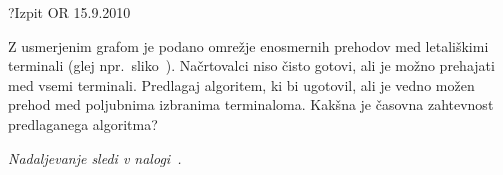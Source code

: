 \begin{naloga}{?}{Izpit OR 15.9.2010}
\begin{vprasanje}
Z usmerjenim grafom je podano omrežje enosmernih prehodov
med letališkimi terminali (glej npr.~sliko~).
Načrtovalci niso čisto gotovi, ali je možno prehajati med vsemi terminali.
Predlagaj algoritem, ki bi ugotovil,
ali je vedno možen prehod med poljubnima izbranima terminaloma.
Kakšna je časovna zahtevnost predlaganega algoritma?

{\em Nadaljevanje sledi v nalogi~.}
\end{vprasanje}
\begin{odgovor}
\end{odgovor}
\end{naloga}
